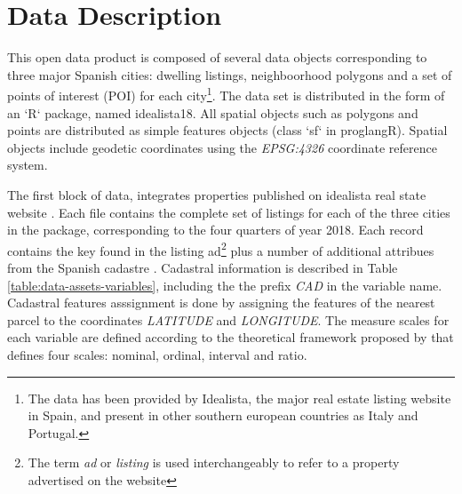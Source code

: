 \documentclass[times,final]{elsarticle}
\newcommand{\pkg}[1]{{\normalfont\fontseries{b}\selectfont #1}} \let\proglang=\textsf \let\code=\texttt
\begin{document}
\section*{Data Description}

\noindent

This open data product \cite{arribas2021open} is composed of several data objects corresponding to three major Spanish cities: dwelling listings, neighboorhood polygons and a set of points of interest (POI) for each city\footnote{The data has been provided by Idealista, the major real estate listing website in Spain, and present in other southern european countries as Italy and Portugal.}. The data set is distributed in the form of an `R` package, named \pkg{idealista18}. All spatial objects such as polygons and points are distributed as simple features objects (class `sf` in proglang{R}). Spatial objects include geodetic coordinates using the \emph{EPSG:4326} coordinate reference system.

The first block of data, integrates properties published on idealista real state website \cite{idealista}. Each file contains the complete set of listings for each of the three cities in the package, corresponding to the four quarters of year 2018. Each record contains the key found in the listing ad\footnote{The term \emph{ad} or \emph{listing} is used interchangeably to refer to a property advertised on the website} plus a number of additional attribues from the Spanish cadastre \cite{Catastro}. Cadastral information is described in Table \ref{table:data-assets-variables}, including the the prefix \emph{CAD} in the variable name. Cadastral features asssignment is done by assigning the features of the nearest parcel to the coordinates \emph{LATITUDE} and \emph{LONGITUDE}. The measure scales for each variable are defined according to the theoretical framework proposed by \cite{stevens1946theory} that defines four scales: nominal, ordinal, interval and ratio.
\end{document}

